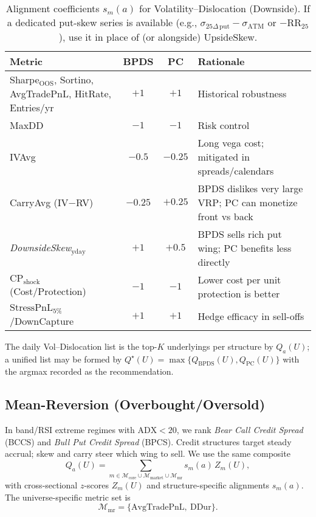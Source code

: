 \documentclass[12pt,a4paper]{report}
\begin{document}
\begin{table}[h]
\centering
\begin{tabular}{lccp{7.3cm}}
\toprule
\textbf{Metric} & \textbf{BPDS} & \textbf{PC} & \textbf{Rationale} \\
\midrule
Sharpe$_{\text{OOS}}$, Sortino, AvgTradePnL, HitRate, Entries/yr & $+1$ & $+1$ & Historical robustness \\
MaxDD & $-1$ & $-1$ & Risk control \\
IVAvg & $-0.5$ & $-0.25$ & Long vega cost; mitigated in spreads/calendars \\
CarryAvg (IV$-$RV) & $-0.25$ & $+0.25$ & BPDS dislikes very large VRP; PC can monetize front vs back \\
\emph{DownsideSkew}$_{\text{yday}}$ & $+1$ & $+0.5$ & BPDS sells rich put wing; PC benefits less directly \\
$\mathrm{CP}_{\text{shock}}$ (Cost/Protection) & $-1$ & $-1$ & Lower cost per unit protection is better \\
$\mathrm{StressPnL}_{5\%}$/DownCapture & $+1$ & $+1$ & Hedge efficacy in sell-offs \\
\bottomrule
\end{tabular}
\caption{Alignment coefficients $s_m(a)$ for Volatility–Dislocation (Downside). If a dedicated put-skew series is available (e.g., $\sigma_{25\Delta\,\text{put}}-\sigma_{\mathrm{ATM}}$ or $-\mathrm{RR}_{25}$), use it in place of (or alongside) UpsideSkew.}
\label{tab:align-voldisl}
\end{table}

\noindent The daily Vol–Dislocation list is the top-$K$ underlyings per structure by $Q_a(U)$; a unified list may be formed by $Q^\star(U)=\max\{Q_{\text{BPDS}}(U),Q_{\text{PC}}(U)\}$ with the argmax recorded as the recommendation.

\subsection{Mean-Reversion (Overbought/Oversold)}
In band/RSI extreme regimes with $\mathrm{ADX}<20$, we rank \emph{Bear Call Credit Spread} (BCCS) and \emph{Bull Put Credit Spread} (BPCS). Credit structures target steady accrual; skew and carry steer which wing to sell. We use the same composite
\[
Q_a(U)=\sum_{m\in \mathcal{M}_{\text{core}}\cup\mathcal{M}_{\text{market}}\cup\mathcal{M}_{\text{mr}}}
s_m(a)\,Z_m(U),
\]
with cross-sectional $z$-scores $Z_m(U)$ and structure-specific alignments $s_m(a)$. The universe-specific metric set is
\[
\mathcal{M}_{\text{mr}}=\{\mathrm{AvgTradePnL},\ \mathrm{DDur}\}.
\]
\end{document}
